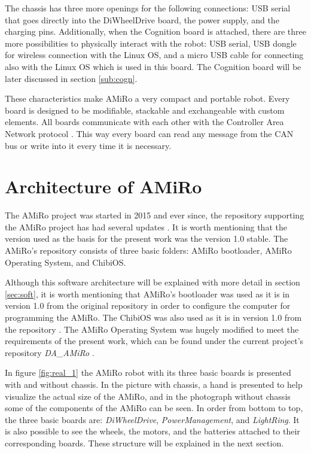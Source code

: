 \documentclass[12pt]{report}%
\begin{document}
The chassis has three more openings for the following connections: USB serial that goes directly into the DiWheelDrive board, the power supply, and the charging pins. Additionally, when the Cognition board is attached, there are three more possibilities to physically interact with the robot: USB serial, USB dongle for wireless connection with the Linux OS, and a micro USB cable for connecting also with the Linux OS which is used in this board. The Cognition board will be later discussed in section \ref{sub:cogn}.

These characteristics make AMiRo a very compact and portable robot. Every board is designed to be modifiable, stackable and exchangeable with custom elements. All boards communicate with each other with the Controller Area Network protocol \cite{AMiRo_paper_modular}. This way every board can read any message from the CAN bus or write into it every time it is necessary.

\chapter{Architecture of AMiRo}
The AMiRo project was started in 2015 and ever since, the repository supporting the AMiRo project has had several updates \cite{AMiRo_Wiki}. It is worth mentioning that the version used as the basis for the present work was the version 1.0 stable. The AMiRo's repository consists of three basic folders: AMiRo bootloader, AMiRo Operating System, and ChibiOS.

Although this software architecture will be explained with more detail in section \ref{sec:soft}, it is worth mentioning that AMiRo's bootloader was used as it is in version 1.0 from the original repository in order to configure the computer for programming the AMiRo. The ChibiOS was also used as it is in version 1.0 from the repository \cite{AMiRo_Wiki}. The AMiRo Operating System was hugely modified to meet the requirements of the present work, which can be found under the current project's repository \textit{DA\_AMiRo} \cite{AMiRo_Git}.

In figure \ref{fig:real_1} the AMiRo robot with its three basic boards is presented with and without chassis. In the picture with chassis, a hand is presented to help visualize the actual size of the AMiRo, and in the photograph without chassis some of the components of the AMiRo can be seen. In order from bottom to top, the three basic boards are: \textit{DiWheelDrive}, \textit{PowerManagement}, and \textit{LightRing}. It is also possible to see the wheels, the motors, and the batteries attached to their corresponding boards. These structure will be explained in the next section.
\end{document}
